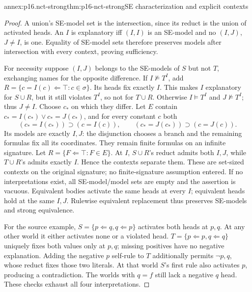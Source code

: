 \begin{annexitem}{annex:p16.nct-strong}{thm:p16-nct-strong}{SE characterization and explicit contexts}
\begin{proof}
A union's SE-model set is the intersection, since its reduct is the union
of activated heads. An \(I\) is explanatory iff \((I,I)\) is an SE-model
and no \((I,J)\), \(J\ne I\), is one. Equality of SE-model sets therefore
preserves models after intersection with every context, proving sufficiency.

For necessity suppose \((I,J)\) belongs to the SE-models of \(S\) but not
\(T\), exchanging names for the opposite difference.
If \(I\not\models T^I\), add
\(R=\{c=I(c)\Leftarrow\top:c\in\sigma\}\).
Its heads fix exactly \(I\). This makes \(I\) explanatory for \(S\cup R\),
but it still violates \(T^I\), so not for \(T\cup R\).
Otherwise \(I\models T^I\) and \(J\not\models T^I\); thus \(J\ne I\).
Choose \(c_*\) on which they differ. Let \(E\) contain
\(c_*=I(c_*)\lor c_*=J(c_*)\), and for every constant \(c\) both
\[
 (c_*=I(c_*))\supset(c=I(c)),\qquad
 (c_*=J(c_*))\supset(c=J(c)).
\]
Its models are exactly \(I,J\): the disjunction chooses a branch and the
remaining formulas fix all its coordinates. They remain finite formulas
on an infinite signature. Let \(R=\{F\Leftarrow\top:F\in E\}\).
At \(I\), \(S\cup R\)'s reduct admits both \(I,J\), while \(T\cup R\)'s
admits exactly \(I\). Hence the contexts separate them. These are set-sized
contexts on the original signature; no finite-signature assumption entered.
If no interpretations exist, all SE-model/model sets are empty and the
assertion is vacuous.
Equivalent bodies activate the same heads at every \(I\); equivalent heads
hold at the same \(I,J\). Rulewise equivalent replacement thus preserves
SE-models and strong equivalence.

For the source example, \(S=\{p\Leftarrow q,q\Leftarrow p\}\) activates
both heads at \(p,q\). At any other world it either activates none or a
violated head. \(T=\{p\Leftarrow p,q\Leftarrow q\}\) uniquely fixes both
values only at \(p,q\); missing positives have no negative explanation.
Adding the negative \(p\) self-rule to \(T\) additionally permits
\(\neg p,q\), whose reduct fixes those two literals.
At that world \(S\)'s first rule also activates \(p\), producing a
contradiction. The worlds with \(q=f\) still lack a negative \(q\) head.
These checks exhaust all four interpretations.
\end{proof}
\end{annexitem}

